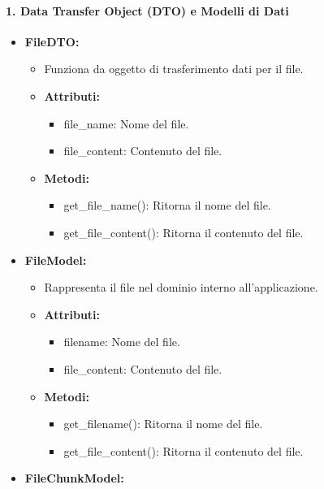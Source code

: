     \paragraph{1. Data Transfer Object (DTO) e Modelli di Dati}
    \begin{itemize}
        \item \textbf{FileDTO:}
        \begin{itemize}
            \item Funziona da oggetto di trasferimento dati per il file.
            \item \textbf{Attributi:}
            \begin{itemize}
                \item file\_name: Nome del file.
                \item file\_content: Contenuto del file.
            \end{itemize}
            \item \textbf{Metodi:}
            \begin{itemize}
                \item get\_file\_name(): Ritorna il nome del file.
                \item get\_file\_content(): Ritorna il contenuto del file.
            \end{itemize}
        \end{itemize}
        \item \textbf{FileModel:}
        \begin{itemize}
            \item Rappresenta il file nel dominio interno all’applicazione.
            \item \textbf{Attributi:}
            \begin{itemize}
                \item filename: Nome del file.
                \item file\_content: Contenuto del file.
            \end{itemize}
            \item \textbf{Metodi:}
            \begin{itemize}
                \item get\_filename(): Ritorna il nome del file.
                \item get\_file\_content(): Ritorna il contenuto del file.
            \end{itemize}
        \end{itemize}
        \item \textbf{FileChunkModel:}

\end{itemize}
